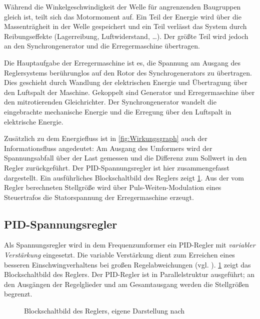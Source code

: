 Während die Winkelgeschwindigkeit der Welle für angrenzenden Baugruppen gleich ist, teilt sich das Motormoment auf. Ein Teil der Energie wird über die Massenträgheit in der Welle gespeichert und ein Teil verlässt das System durch Reibungseffekte (Lagerreibung, Luftwiderstand, \ldots). Der größte Teil wird jedoch an den Synchrongenerator und die Erregermaschine übertragen.

Die Hauptaufgabe der Erregermaschine ist es, die Spannung am Ausgang des Reglersystems berührunglos auf den Rotor des Synchrogenerators zu übertragen. Dies geschieht durch Wandlung der elektrischen Energie und Übertragung über den Luftspalt der Maschine. Gekoppelt sind Generator und Erregermaschine über den mitrotierenden Gleichrichter. Der Synchrongenerator wandelt die eingebrachte mechanische Energie und die Erregung über den Luftspalt in elektrische Energie.

Zusätzlich zu dem Energiefluss ist in \cref{fig:Wirkungsgraph} auch der Informationsfluss angedeutet: Am Ausgang des Umformers wird der Spannungsabfall über der Last gemessen und die Differenz zum Sollwert in den Regler zurückgeführt. Der PID-Spannungsregler ist hier zusammengefasst dargestellt. Ein ausführliches Blockschaltbild des Reglers zeigt \cref{fig:Blockschaltbild_Regler}. Aus der vom Regler berechneten Stellgröße wird über Puls-Weiten-Modulation eines Steuertrafos die Statorspannung der Erregermaschine erzeugt.

\subsection{PID-Spannungsregler}\label{sec:pid-spannungsregler}

Als Spannungsregler wird in dem Frequenzumformer ein PID-Regler mit \emph{variabler Verstärkung} eingesetzt. Die variable Verstärkung dient zum Erreichen eines besseren Einschwingverhaltens bei großen Regelabweichungen (vgl. \cite{pillerpowerssystemsDigitalerSpannungsreglerSoftwaredokumentation1997}). \cref{fig:Blockschaltbild_Regler} zeigt das Blockschaltbild des Reglers. Der PID-Regler ist in Parallelstruktur ausgeführt; an den Ausgängen der Regelglieder und am Gesamtausgang werden die Stellgrößen begrenzt. 

\begin{figure}
    \centering
    
    \caption{Blockschaltbild des Reglers, eigene Darstellung nach \cite{pillerpowersystemsGenBsb11APOJET1999}}
    \label{fig:Blockschaltbild_Regler}
\end{figure}

